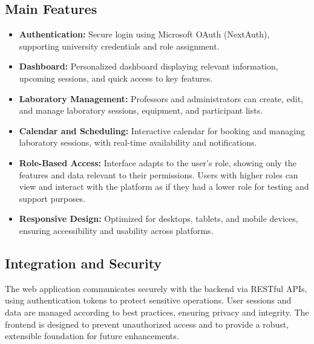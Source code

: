 \subsection{Main Features}
\begin{itemize}
    \item \textbf{Authentication:} Secure login using Microsoft OAuth (NextAuth), supporting university credentials and role assignment.
    \item \textbf{Dashboard:} Personalized dashboard displaying relevant information, upcoming sessions, and quick access to key features.
    \item \textbf{Laboratory Management:} Professors and administrators can create, edit, and manage laboratory sessions, equipment, and participant lists.
    \item \textbf{Calendar and Scheduling:} Interactive calendar for booking and managing laboratory sessions, with real-time availability and notifications.
    \item \textbf{Role-Based Access:} Interface adapts to the user's role, showing only the features and data relevant to their permissions. Users with higher roles can view and interact with the platform as if they had a lower role for testing and support purposes.
    \item \textbf{Responsive Design:} Optimized for desktops, tablets, and mobile devices, ensuring accessibility and usability across platforms.
\end{itemize}

\subsection{Integration and Security}
The web application communicates securely with the backend via RESTful APIs, using authentication tokens to protect sensitive operations. User sessions and data are managed according to best practices, ensuring privacy and integrity. The frontend is designed to prevent unauthorized access and to provide a robust, extensible foundation for future enhancements. 